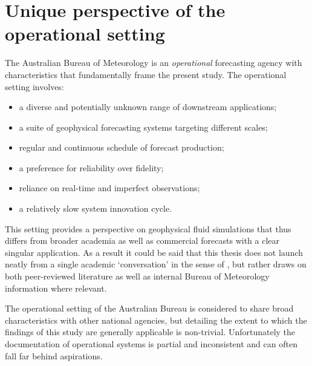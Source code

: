 \section{Unique perspective of the operational setting}
\label{S:operational_setting}

The Australian Bureau of Meteorology is an \emph{operational} forecasting agency with characteristics that fundamentally frame the present study. The operational setting involves:
\begin{itemize}
    \item a diverse and potentially unknown range of downstream applications;
    \item a suite of geophysical forecasting systems targeting different scales;
    \item regular and continuous schedule of forecast production;
    \item a preference for reliability over fidelity;
    \item reliance on real-time and imperfect observations;
    \item a relatively slow system innovation cycle.
\end{itemize}
This setting provides a perspective on geophysical fluid simulations that thus differs from broader academia as well as commercial forecasts with a clear singular application.   As a result it could be said that this thesis does not launch neatly from a single academic `conversation' in the sense of \citeauthor{Booth:2009vy}, but rather draws on both peer-reviewed literature as well as internal Bureau of Meteorology information where relevant.

The operational setting of the Australian Bureau is considered to share broad characteristics with other national agencies, but detailing the extent to which the findings of this study are generally applicable is non-trivial.    
Unfortunately the documentation of operational systems is partial and inconsistent and can often fall far behind aspirations.  

